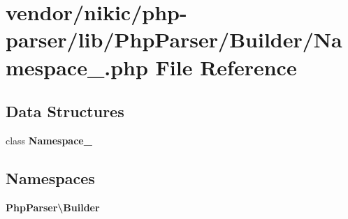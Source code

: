 \section{vendor/nikic/php-\/parser/lib/\+Php\+Parser/\+Builder/\+Namespace\+\_\+.php File Reference}
\label{_builder_2_namespace___8php}
\subsection*{Data Structures}
\begin{DoxyCompactItemize}
\item 
class {\bf Namespace\+\_\+}
\end{DoxyCompactItemize}
\subsection*{Namespaces}
\begin{DoxyCompactItemize}
\item 
 {\bf Php\+Parser\textbackslash{}\+Builder}
\end{DoxyCompactItemize}
